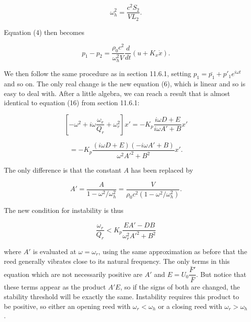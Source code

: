   \begin{equation*}\omega_h^2=\dfrac{c^2 S_2}{VL_2} . \tag{5}\end{equation*} 

  Equation (4) then becomes 

  \begin{equation*}p_1-p_2=\dfrac{\rho_0 c^2}{\omega_h^2 V} 
  \dfrac{d}{dt}\left(u+K_x \dot{x} \right) . \tag{6}\end{equation*} 

  We then follow the same procedure as in section 11.6.1, setting 
  $p_1=\bar{p_1}+ p'_1 e^{i \omega t}$ and so on. The only real change is the 
  new equation (6), which is linear and so is easy to deal with. After a little 
  algebra, we can reach a result that is almost identical to equation (16) from 
  section 11.6.1: 

  \begin{equation*}\left[ -\omega^2 + i \omega \dfrac{\omega_r}{Q_r} + 
  \omega_r^2 \right]x' = -K_p \dfrac{i \omega D + E}{i \omega A' + B} 
  x'\end{equation*} 

  \begin{equation*}=-K_p \dfrac{(i \omega D + E)(-i \omega A' + B)}{\omega^2 
  A'^2 + B^2} x' . \tag{7}\end{equation*} 

  The only difference is that the constant $A$ has been replaced by 

  \begin{equation*}A'=\dfrac{A}{1-\omega^2/\omega_h^2}=\dfrac{V}{\rho_0 c^2 
  (1-\omega^2/\omega_h^2)} . \tag{8}\end{equation*} 

  The new condition for instability is thus 

  \begin{equation*}\dfrac{\omega_r}{Q_r} < K_p\dfrac{EA'-DB}{\omega_r^2 A'^2 + 
  B^2} \tag{9}\end{equation*} 

  \noindent{}where $A'$ is evaluated at $\omega=\omega_r$, using the same 
  approximation as before that the reed generally vibrates close to its natural 
  frequency. The only terms in this equation which are not necessarily positive 
  are $A'$ and $E=U_0 \dfrac{\bar{F}'}{\bar{F}}$. But notice that these terms 
  appear as the product $A'E$, so if the signs of both are changed, the 
  stability threshold will be exactly the same. Instability requires this 
  product to be positive, so either an opening reed with $\omega_r < \omega_h$ 
  or a closing reed with $\omega_r > \omega_h$. 

